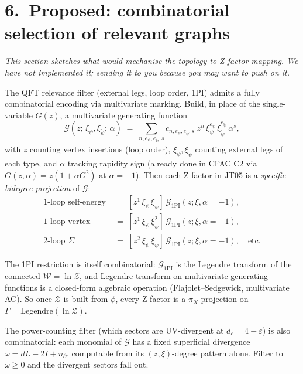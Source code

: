 \documentclass[11pt,a4paper]{article}
\begin{document}
\section*{6.\ Proposed: combinatorial selection of relevant graphs}

\emph{This section sketches what would mechanise the topology-to-Z-factor mapping. We have not implemented it; sending it to you because you may want to push on it.}

\medskip
The QFT relevance filter (external legs, loop order, 1PI) admits a fully combinatorial encoding via multivariate marking. Build, in place of the single-variable $G(z)$, a multivariate generating function
\[
\mathcal{G}(z;\,\xi_\psi, \xi_{\tilde\psi};\,\alpha) \;=\; \sum_{n,e_\psi,e_{\tilde\psi},s} c_{n,e_\psi,e_{\tilde\psi},s}\;
z^{n}\,\xi_\psi^{e_\psi}\,\xi_{\tilde\psi}^{e_{\tilde\psi}}\,\alpha^{s},
\]
with $z$ counting vertex insertions (loop order), $\xi_\psi, \xi_{\tilde\psi}$ counting external legs of each type, and $\alpha$ tracking rapidity sign (already done in CFAC C2 via $G(z,\alpha)=z(1+\alpha G^2)$ at $\alpha = -1$). Then each Z-factor in JT05 is a \emph{specific bidegree projection} of $\mathcal{G}$:
\begin{align*}
\text{1-loop self-energy} &\;=\; [z^1\,\xi_\psi\,\xi_{\tilde\psi}]\,\mathcal{G}_{\text{1PI}}(z;\xi,\alpha{=}{-}1),\\
\text{1-loop vertex} &\;=\; [z^1\,\xi_\psi\,\xi_{\tilde\psi}^2]\,\mathcal{G}_{\text{1PI}}(z;\xi,\alpha{=}{-}1),\\
\text{2-loop }\Sigma &\;=\; [z^2\,\xi_\psi\,\xi_{\tilde\psi}]\,\mathcal{G}_{\text{1PI}}(z;\xi,\alpha{=}{-}1), \quad\text{etc.}
\end{align*}

The 1PI restriction is itself combinatorial: $\mathcal{G}_{\text{1PI}}$ is the Legendre transform of the connected $\mathcal{W} = \ln\mathcal{Z}$, and Legendre transform on multivariate generating functions is a closed-form algebraic operation (Flajolet--Sedgewick, multivariate AC). So once $\mathcal{Z}$ is built from $\phi$, every Z-factor is a $\pi_X$ projection on $\Gamma = \text{Legendre}(\ln\mathcal{Z})$.

The power-counting filter (which sectors are UV-divergent at $d_c = 4{-}\varepsilon$) is also combinatorial: each monomial of $\mathcal{G}$ has a fixed superficial divergence $\omega = dL - 2I + n_\partial$, computable from its $(z, \xi)$-degree pattern alone. Filter to $\omega \ge 0$ and the divergent sectors fall out.
\end{document}
